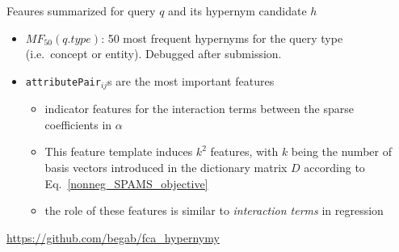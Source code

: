\documentclass{beamer}
\newlength{\sepwid}
\newlength{\onecolwid}
\begin{document}
\begin{frame}[t]
\begin{columns}[t]
\begin{column}{\onecolwid}
\begin{block}{Feaures summarized}{ for query $q$ and its hypernym candidate $h$ }

\begin{itemize}
  \item $MF_{50}(q.type)$: 50 most frequent hypernyms for the query type
    (i.e.~concept or entity). Debugged after submission.


  \item \texttt{attributePair}$_{ij}$s are the most important features
    \begin{itemize}
      \item indicator features for the interaction terms between the sparse
        coefficients in $\alpha$
      \item This feature template induces $k^2$ features, with $k$ being the
        number of basis vectors introduced in the dictionary matrix $D$
        according to Eq.~\ref{nonneg_SPAMS_objective}
      \item the role of these features is similar to \emph{interaction terms}
        in regression
    \end{itemize}
\end{itemize}
\end{block}

  \begin{alertblock}{} \url{https://github.com/begab/fca_hypernymy} \end{alertblock} 

\end{column}

\begin{column}{\sepwid} %
\end{column}


\end{columns}
\end{frame}
\end{document}
